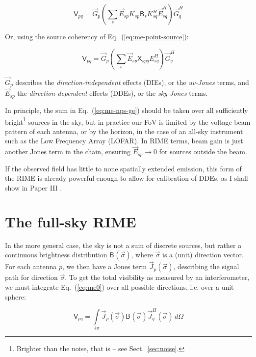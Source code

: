 \documentclass{aa}
\newcommand{\herm}{H}
\newcommand{\jones}[2]{\vec {#1}_{#2}}
\newcommand{\jonesT}[2]{\vec {#1}^{\herm}_{#2}}
\newcommand{\coh}[2]{\mathsf{{#1}}_{{#2}}}
\begin{document}
  \begin{equation}\label{eq:me-nps-gek}
  \coh{V}{pq} = \jones{G}{p} \left ( \sum_{s}{\jones{E}{sp} K_{sp} \coh{B}{s} K^\herm_{sq} \jonesT{E}{sq}} \right ) \jonesT{G}{q}
  \end{equation}

Or, using the source coherency of Eq.~(\ref{eq:me-point-source}):

  \begin{equation}\label{eq:me-nps-ge}
  \coh{V}{pq} = \jones{G}{p} \left ( \sum_{s}{\jones{E}{sp} \coh{X}{spq} E^\herm_{sq}} \right ) \jonesT{G}{q}
  \end{equation}

$\jones{G}{p}$ describes the {\em direction-independent} effects (DIEs), or the \emph{uv-Jones} terms, and $\jones{E}{sp}$ the {\em  direction-dependent} effects (DDEs), or the \emph{sky-Jones} terms. 

In principle, the sum in Eq.~(\ref{eq:me-nps-ge}) should be taken over all sufficiently bright\footnote{Brighter than the noise, that is -- see Sect.~\ref{sec:noise}.} sources in the sky, but in practice our FoV is limited by the voltage beam pattern of each antenna, or by the horizon, in the case of an all-sky instrument such as the Low Frequency Array (LOFAR). In RIME terms, beam gain is just another Jones term in the chain, ensuring $\jones{E}{sp}\to 0$ for sources outside the beam.

If the observed field has little to none spatially extended emission, this form of the RIME is already powerful enough to allow for calibration of DDEs, as I shall show in Paper III \citep{RRIME3}.

\section{The full-sky RIME\label{sec:full-sky-rime}}

In the more general case, the sky is not a sum of discrete sources, but rather a continuous brightness distribution $\coh{B}{}(\vec\sigma)$, where $\vec\sigma$ is a (unit) direction vector. For each antenna $p$, we then have a Jones term $\jones{J}{p}(\vec\sigma)$, describing the signal path for direction $\vec\sigma$. To get the total visibility as measured by an interferometer, we must integrate Eq.~(\ref{eq:me0}) over all possible directions, i.e. over a unit sphere:

\[
\coh{V}{pq} = \int\limits_{4\pi} \jones{J}{p}(\vec\sigma) \coh{B}{}(\vec\sigma) \jonesT{J}{q}(\vec\sigma) \, d\Omega
\]
\end{document}
